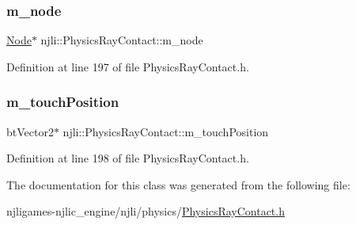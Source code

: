 \mbox{\label{classnjli_1_1_physics_ray_contact_ae315ed84ad9ab0f019a7a515f5a30f34}} 
\subsubsection{\texorpdfstring{m\+\_\+node}{m\_node}}
{\footnotesize\ttfamily \mbox{\hyperlink{classnjli_1_1_node}{Node}}$\ast$ njli\+::\+Physics\+Ray\+Contact\+::m\+\_\+node\hspace{0.3cm}{\ttfamily [private]}}



Definition at line 197 of file Physics\+Ray\+Contact.\+h.

\mbox{\label{classnjli_1_1_physics_ray_contact_ad676d79b15af074e79631759e42f59aa}} 
\subsubsection{\texorpdfstring{m\+\_\+touch\+Position}{m\_touchPosition}}
{\footnotesize\ttfamily bt\+Vector2$\ast$ njli\+::\+Physics\+Ray\+Contact\+::m\+\_\+touch\+Position\hspace{0.3cm}{\ttfamily [private]}}



Definition at line 198 of file Physics\+Ray\+Contact.\+h.



The documentation for this class was generated from the following file\+:\begin{DoxyCompactItemize}
\item 
njligames-\/njlic\+\_\+engine/njli/physics/\mbox{\hyperlink{_physics_ray_contact_8h}{Physics\+Ray\+Contact.\+h}}\end{DoxyCompactItemize}
